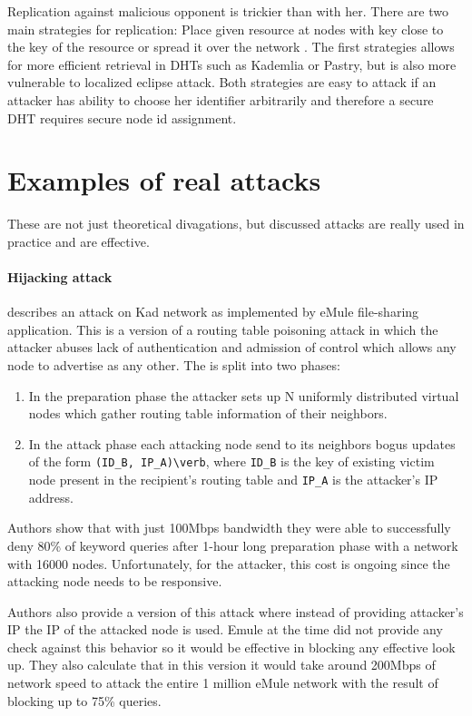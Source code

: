   Replication against malicious opponent is trickier than with her. There are
  two main strategies for replication: Place given resource at nodes with key
  close to the key of the resource or spread it over the network \cite[p.
  38]{urd11}. The first strategies allows for more efficient retrieval in DHTs
  such as Kademlia or Pastry, but is also more vulnerable to localized eclipse
  attack. Both strategies are easy to attack if an attacker has ability to
  choose her identifier arbitrarily and therefore a secure DHT requires secure
  node id assignment.

\section{Examples of real attacks}
These are not just theoretical divagations, but discussed attacks are really
used in practice and are effective.

\paragraph{Hijacking attack}
\cite{wan08} describes an attack on Kad network as implemented by eMule
file-sharing application. This is a version of a routing table poisoning attack
in which the attacker abuses lack of authentication and admission of control
which allows any node to advertise as any other. The is split into two phases:
\begin{enumerate}
  \item In the preparation phase the attacker sets up N uniformly distributed
    virtual nodes which gather routing table information of their neighbors.
  \item In the attack phase each attacking node send to its neighbors bogus
    updates of the form \verb|(ID_B, IP_A)\verb|, where \verb|ID_B| is the key
    of existing victim node present in the recipient's routing table and
    \verb|IP_A| is the attacker's IP address.
\end{enumerate}

Authors show that with just 100Mbps bandwidth they were able to successfully
deny 80\% of keyword queries after 1-hour long preparation phase with a
network with 16000 nodes. Unfortunately, for the attacker, this cost is ongoing
since the attacking node needs to be responsive.

Authors also provide a version of this attack where instead of providing
attacker's IP the IP of the attacked node is used. Emule at the time did not
provide any check against this behavior so it would be effective in blocking
any effective look up. They also calculate that in this version it would take
around 200Mbps of network speed to attack the entire 1 million eMule network
with the result of blocking up to 75\% queries.


